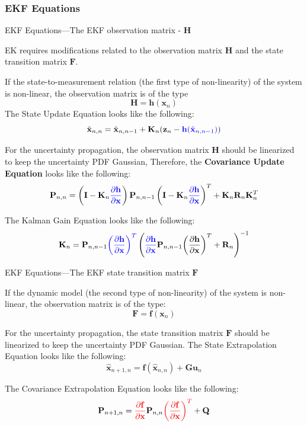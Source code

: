 \subsubsection{EKF Equations}
\begin{frame}{EKF Equations---The EKF observation matrix - $\mathbf{H}$}

EK requires modifications related to the observation matrix $\mathbf{H}$ and the state transition matrix $\mathbf{F}$.

If the state-to-measurement relation (the first type of non-linearity) of the system is
non-linear, the observation matrix is of the type
\[
\mathbf{H} = \mathbf{h}(\mathbf{x}_n)
\]
The State Update Equation looks like the following:
\[
\hat{\mathbf{x}}_{n,n} = \hat{\mathbf{x}}_{n,n-1} + \mathbf{K}_n (\mathbf{z}_n - \textcolor{blue}{\mathbf{h}(\hat{\mathbf{x}}_{n,n-1})})
\]

For the uncertainty propagation, the observation matrix \(\mathbf{H}\) should be linearized to keep the uncertainty PDF Gaussian, Therefore, the \textbf{Covariance Update Equation} looks like the following:
\[
\mathbf{P}_{n,n} = \left( \mathbf{I} - \mathbf{K}_n \textcolor{blue}{\frac{\partial \mathbf{h}}{\partial \mathbf{x}}} \right) \mathbf{P}_{n,n-1} \left( \mathbf{I} - \mathbf{K}_n \textcolor{blue}{\frac{\partial \mathbf{h}}{\partial \mathbf{x}}} \right)^T + \mathbf{K}_n \mathbf{R}_n \mathbf{K}_n^T
\]

The Kalman Gain Equation looks like the following:
\[
\mathbf{K}_n = \mathbf{P}_{n,n-1} \textcolor{blue}{\left( \frac{\partial \mathbf{h}}{\partial \mathbf{x}} \right)^T} \left( \textcolor{blue}{\frac{\partial \mathbf{h}}{\partial \mathbf{x}}} \mathbf{P}_{n,n-1} {\left( \frac{\partial \mathbf{h}}{\partial \mathbf{x}} \right)^T} + \mathbf{R}_n \right)^{-1}
\]
\end{frame}


\begin{frame}{EKF Equations---The EKF state transition matrix $\mathbf{F}$}

If the dynamic model (the second type of non-linearity) of the system is non-linear,
the observation matrix is of the type:
\[
\mathbf{F} = \mathbf{f}(\mathbf{x}_n)
\]

For the uncertainty propagation, the state transition matrix \(\mathbf{F}\) should be linearized to keep the uncertainty PDF Gaussian. The State Extrapolation Equation looks like the following:
\[
\hat{\mathbf{x}}_{n+1,n} = \mathbf{f}(\hat{\mathbf{x}}_{n,n}) + \mathbf{G} \mathbf{u}_n
\]

The Covariance Extrapolation Equation looks like the following:
\[
\mathbf{P}_{n+1,n} = \textcolor{red}{\frac{\partial \mathbf{f}}{\partial \mathbf{x}}} \mathbf{P}_{n,n} \textcolor{red}{\left( \frac{\partial \mathbf{f}}{\partial \mathbf{x}} \right)^T} + \mathbf{Q}
\]
\end{frame}


